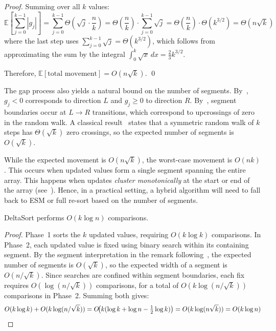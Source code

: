 \begin{proof}
Summing over all $k$ values:
\[
\mathbb{E}\!\left[\sum_{j=0}^{k-1} |g_j|\right] = \sum_{j=0}^{k-1} \Theta\!\left(\sqrt{j} \cdot \frac{n}{k}\right) = \Theta\!\left(\frac{n}{k}\right) \cdot \sum_{j=0}^{k-1} \sqrt{j} = \Theta\!\left(\frac{n}{k}\right) \cdot \Theta(k^{3/2}) = \Theta(n\sqrt{k})
\]
where the last step uses $\sum_{j=0}^{k-1} \sqrt{j} = \Theta(k^{3/2})$, which follows from approximating the sum by the integral $\int_0^{k} \sqrt{x}\, dx = \tfrac{2}{3} k^{3/2}$.

Therefore, $\mathbb{E}[\text{total movement}] = O(n\sqrt{k})$. \qed
\end{proof}

\begin{remark}
The gap process also yields a natural bound on the number of segments. By~, $g_j < 0$ corresponds to direction $L$ and $g_j \ge 0$ to direction $R$. By~, segment boundaries occur at $L \to R$ transitions, which correspond to upcrossings of zero in the random walk. A classical result~\cite{feller1968} states that a symmetric random walk of $k$ steps has $\Theta(\sqrt{k})$ zero crossings, so the expected number of segments is $O(\sqrt{k})$.
\end{remark}

\begin{remark}
While the expected movement is $O(n\sqrt{k})$, the worst-case movement is $O(nk)$. This occurs when updated values form a single segment spanning the entire array. This happens when updates \emph{cluster monotonically} at the start or end of the array (see~). Hence, in a practical setting, a hybrid algorithm will need to fall back to ESM or full re-sort based on the number of segments.
\end{remark}



\begin{lemma}
\label{lem:comparison-count}
DeltaSort performs $O(k \log n)$ comparisons.
\end{lemma}

\begin{proof}
Phase~1 sorts the $k$ updated values, requiring $O(k \log k)$ comparisons. In Phase~2, each updated value is fixed using binary search within its containing segment. By the segment interpretation in the remark following~, the expected number of segments is $O(\sqrt{k})$, so the expected width of a segment is $O(n/\sqrt{k})$. Since searches are confined within segment boundaries, each fix requires $O(\log (n/\sqrt{k}))$ comparisons, for a total of $O(k \log (n/\sqrt{k}))$ comparisons in Phase~2. Summing both gives:
\[
O(k \log k) + O(k \log (n/\sqrt{k})) = O\!\bigl(k(\log k + \log n - \tfrac{1}{2}\log k)\bigr) = O(k \log (n \sqrt{k})) = O(k \log n) \qedhere
\]
\end{proof}

